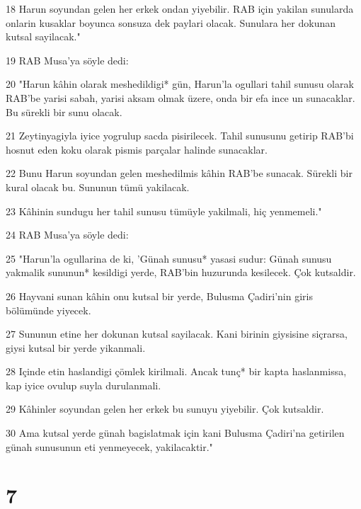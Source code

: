 \par 18 Harun soyundan gelen her erkek ondan yiyebilir. RAB için yakilan sunularda onlarin kusaklar boyunca sonsuza dek paylari olacak. Sunulara her dokunan kutsal sayilacak."
\par 19 RAB Musa'ya söyle dedi:
\par 20 "Harun kâhin olarak meshedildigi* gün, Harun'la ogullari tahil sunusu olarak RAB'be yarisi sabah, yarisi aksam olmak üzere, onda bir efa ince un sunacaklar. Bu sürekli bir sunu olacak.
\par 21 Zeytinyagiyla iyice yogrulup sacda pisirilecek. Tahil sunusunu getirip RAB'bi hosnut eden koku olarak pismis parçalar halinde sunacaklar.
\par 22 Bunu Harun soyundan gelen meshedilmis kâhin RAB'be sunacak. Sürekli bir kural olacak bu. Sununun tümü yakilacak.
\par 23 Kâhinin sundugu her tahil sunusu tümüyle yakilmali, hiç yenmemeli."
\par 24 RAB Musa'ya söyle dedi:
\par 25 "Harun'la ogullarina de ki, 'Günah sunusu* yasasi sudur: Günah sunusu yakmalik sununun* kesildigi yerde, RAB'bin huzurunda kesilecek. Çok kutsaldir.
\par 26 Hayvani sunan kâhin onu kutsal bir yerde, Bulusma Çadiri'nin giris bölümünde yiyecek.
\par 27 Sununun etine her dokunan kutsal sayilacak. Kani birinin giysisine siçrarsa, giysi kutsal bir yerde yikanmali.
\par 28 Içinde etin haslandigi çömlek kirilmali. Ancak tunç* bir kapta haslanmissa, kap iyice ovulup suyla durulanmali.
\par 29 Kâhinler soyundan gelen her erkek bu sunuyu yiyebilir. Çok kutsaldir.
\par 30 Ama kutsal yerde günah bagislatmak için kani Bulusma Çadiri'na getirilen günah sunusunun eti yenmeyecek, yakilacaktir."

\chapter{7}

